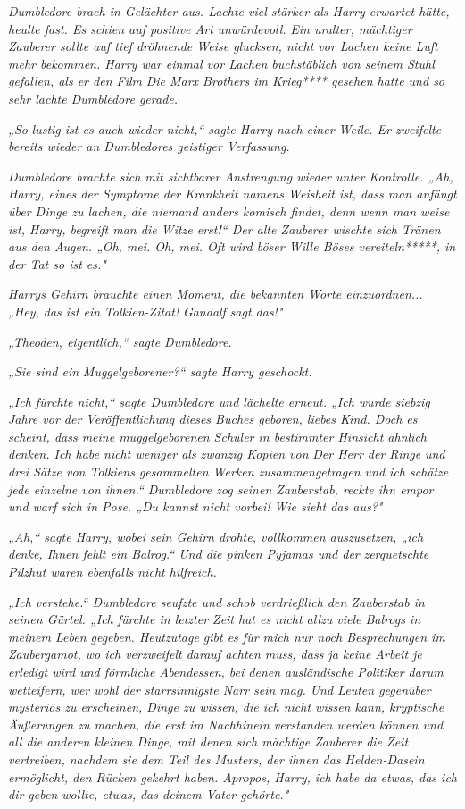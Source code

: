 {\emph{Dumbledore brach in Gelächter aus. Lachte viel stärker als Harry erwartet hätte, heulte fast. Es schien auf positive Art} \emph{\emph{unwürdevoll.}} \emph{Ein uralter, mächtiger Zauberer sollte auf tief dröhnende Weise glucksen, nicht vor Lachen keine Luft mehr bekommen. Harry war einmal vor Lachen buchstäblich von seinem Stuhl gefallen, als er den Film} \emph{\emph{Die Marx Brothers im Krieg}**** gesehen hatte und so sehr lachte Dumbledore gerade.}

\emph{„\emph{So}} \emph{lustig ist es auch wieder nicht,“ sagte Harry nach einer Weile. Er zweifelte bereits wieder an Dumbledores geistiger Verfassung.}

\emph{Dumbledore brachte sich mit sichtbarer Anstrengung wieder unter Kontrolle. „Ah, Harry, eines der Symptome der Krankheit namens Weisheit ist, dass man anfängt über Dinge zu lachen, die niemand anders komisch findet, denn wenn man weise ist, Harry, begreift man die Witze erst!“ Der alte Zauberer wischte sich Tränen aus den Augen. „Oh, mei. Oh, mei. Oft wird böser Wille Böses vereiteln*****, in der Tat so ist es."}

\emph{Harrys Gehirn brauchte einen Moment, die bekannten Worte einzuordnen... „Hey, das ist ein} \emph{\emph{Tolkien}-Zitat!} \emph{\emph{Gandalf}} \emph{sagt das!"}

\emph{„Theoden, eigentlich,“ sagte Dumbledore.}

\emph{„Sie sind ein} \emph{\emph{Muggelgeborener?}“ sagte Harry geschockt.}

\emph{„Ich fürchte nicht,“ sagte Dumbledore und lächelte erneut. „Ich wurde siebzig Jahre vor der Veröffentlichung dieses Buches geboren, liebes Kind. Doch es scheint, dass meine muggelgeborenen Schüler in bestimmter Hinsicht ähnlich denken. Ich habe nicht weniger als zwanzig Kopien von} \emph{\emph{Der Herr der Ringe}} \emph{und drei Sätze von Tolkiens gesammelten Werken zusammengetragen und ich schätze jede einzelne von ihnen.“ Dumbledore zog seinen Zauberstab, reckte ihn empor und warf sich in Pose. „\emph{Du kannst nicht vorbei!}} \emph{Wie sieht das aus?"}

\emph{„Ah,“ sagte Harry, wobei sein Gehirn drohte, vollkommen auszusetzen, „ich denke, Ihnen fehlt ein Balrog.“ Und die pinken Pyjamas und der} \emph{zerquetschte Pilzhut waren ebenfalls nicht hilfreich.}

\emph{„Ich verstehe.“ Dumbledore seufzte und schob verdrießlich den Zauberstab in seinen Gürtel. „Ich fürchte in letzter Zeit hat es nicht allzu viele Balrogs in meinem Leben gegeben. Heutzutage gibt es für mich nur noch Besprechungen im Zaubergamot, wo ich verzweifelt darauf achten muss, dass ja keine Arbeit je erledigt wird und förmliche Abendessen, bei denen ausländische Politiker darum wetteifern, wer wohl der starrsinnigste Narr sein mag. Und Leuten gegenüber mysteriös zu erscheinen, Dinge zu wissen, die ich nicht wissen kann, kryptische Äußerungen zu machen, die erst im Nachhinein verstanden werden können und all die anderen kleinen Dinge, mit denen sich mächtige Zauberer die Zeit vertreiben, nachdem sie dem Teil des Musters, der ihnen das Helden-Dasein ermöglicht, den Rücken gekehrt haben. Apropos, Harry, ich habe da etwas, das ich dir geben wollte, etwas, das deinem Vater gehörte."}

}
